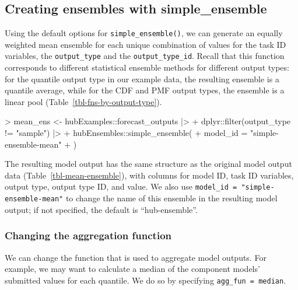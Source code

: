 \documentclass[
]{article}
\newenvironment{Shaded}{\begin{snugshade}}{\end{snugshade}}
\newcommand{\AttributeTok}[1]{\textcolor[rgb]{0.40,0.45,0.13}{#1}}
\newcommand{\FunctionTok}[1]{\textcolor[rgb]{0.28,0.35,0.67}{#1}}
\newcommand{\NormalTok}[1]{\textcolor[rgb]{0.00,0.23,0.31}{#1}}
\newcommand{\OtherTok}[1]{\textcolor[rgb]{0.00,0.23,0.31}{#1}}
\newcommand{\SpecialCharTok}[1]{\textcolor[rgb]{0.37,0.37,0.37}{#1}}
\newcommand{\StringTok}[1]{\textcolor[rgb]{0.13,0.47,0.30}{#1}}
\begin{document}
\subsection{Creating ensembles with
simple\_ensemble}\label{creating-ensembles-with-simple_ensemble}

Using the default options for \texttt{simple\_ensemble()}, we can
generate an equally weighted mean ensemble for each unique combination
of values for the task ID variables, the \texttt{output\_type} and the
\texttt{output\_type\_id}. Recall that this function corresponds to
different statistical ensemble methods for different output types: for
the quantile output type in our example data, the resulting ensemble is
a quantile average, while for the CDF and PMF output types, the ensemble
is a linear pool (Table~\ref{tbl-fns-by-output-type}).

\begin{Shaded}
\begin{Highlighting}[]
\SpecialCharTok{\textgreater{}}\NormalTok{ mean\_ens }\OtherTok{\textless{}{-}}\NormalTok{ hubExamples}\SpecialCharTok{::}\NormalTok{forecast\_outputs }\SpecialCharTok{|\textgreater{}}
\SpecialCharTok{+}\NormalTok{   dplyr}\SpecialCharTok{::}\FunctionTok{filter}\NormalTok{(output\_type }\SpecialCharTok{!=} \StringTok{"sample"}\NormalTok{) }\SpecialCharTok{|\textgreater{}}
\SpecialCharTok{+}\NormalTok{   hubEnsembles}\SpecialCharTok{::}\FunctionTok{simple\_ensemble}\NormalTok{(}
\SpecialCharTok{+}     \AttributeTok{model\_id =} \StringTok{"simple{-}ensemble{-}mean"}
\SpecialCharTok{+}\NormalTok{   )}
\end{Highlighting}
\end{Shaded}

The resulting model output has the same structure as the original model
output data (Table~\ref{tbl-mean-ensemble}), with columns for model ID,
task ID variables, output type, output type ID, and value. We also use
\texttt{model\_id\ =\ "simple-ensemble-mean"} to change the name of this
ensemble in the resulting model output; if not specified, the default is
``hub-ensemble''.

\subsubsection{Changing the aggregation
function}\label{changing-the-aggregation-function}

We can change the function that is used to aggregate model outputs. For
example, we may want to calculate a median of the component models'
submitted values for each quantile. We do so by specifying
\texttt{agg\_fun\ =\ median}.
\end{document}
